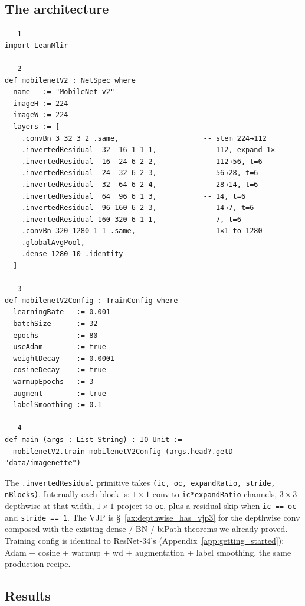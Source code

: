 \subsection*{The architecture}

\begin{verbatim}
-- 1
import LeanMlir

-- 2
def mobilenetV2 : NetSpec where
  name   := "MobileNet-v2"
  imageH := 224
  imageW := 224
  layers := [
    .convBn 3 32 3 2 .same,                    -- stem 224→112
    .invertedResidual  32  16 1 1 1,           -- 112, expand 1×
    .invertedResidual  16  24 6 2 2,           -- 112→56, t=6
    .invertedResidual  24  32 6 2 3,           -- 56→28, t=6
    .invertedResidual  32  64 6 2 4,           -- 28→14, t=6
    .invertedResidual  64  96 6 1 3,           -- 14, t=6
    .invertedResidual  96 160 6 2 3,           -- 14→7, t=6
    .invertedResidual 160 320 6 1 1,           -- 7, t=6
    .convBn 320 1280 1 1 .same,                -- 1×1 to 1280
    .globalAvgPool,
    .dense 1280 10 .identity
  ]

-- 3
def mobilenetV2Config : TrainConfig where
  learningRate   := 0.001
  batchSize      := 32
  epochs         := 80
  useAdam        := true
  weightDecay    := 0.0001
  cosineDecay    := true
  warmupEpochs   := 3
  augment        := true
  labelSmoothing := 0.1

-- 4
def main (args : List String) : IO Unit :=
  mobilenetV2.train mobilenetV2Config (args.head?.getD "data/imagenette")
\end{verbatim}

The \texttt{.invertedResidual} primitive takes
\texttt{(ic, oc, expandRatio, stride, nBlocks)}. Internally each
block is: $1 \times 1$ conv to \texttt{ic*expandRatio} channels,
$3 \times 3$ depthwise at that width, $1 \times 1$ project to
\texttt{oc}, plus a residual skip when \texttt{ic == oc} and
\texttt{stride == 1}. The VJP is
\S~\ref{ax:depthwise_has_vjp3} for the depthwise conv composed with
the existing dense / BN / biPath theorems we already proved.
Training config is identical to ResNet-34's
(Appendix~\ref{app:getting_started}): Adam + cosine + warmup + wd
+ augmentation + label smoothing, the same production recipe.

\subsection*{Results}

